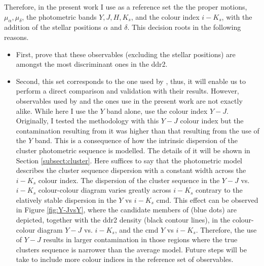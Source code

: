 Therefore, in the present work I use as a reference set the the proper motions, $\mu_{\alpha},\mu_{\delta}$, the photometric bands $Y,J,H,K_s$, and the colour index $i-K_s$, with the addition of the stellar positions  $\alpha$ and $\delta$. This decision roots in the following reasons.

\begin{itemize}

\item First, \citet{Sarro2014} prove that these observables (excluding the stellar positions) are amongst the most discriminant ones in the \gls{ddr2}. 

\item Second, this set corresponds to the one used by \cite{Bouy2015}, thus, it will enable us to perform a direct comparison and validation with their results. 
However, observables used by \cite{Bouy2015} and the ones use in the present work are not exactly alike. While here I use the $Y$ band alone, \citet{Bouy2015} use the colour index $Y-J$. Originally, I tested the methodology with this $Y-J$ colour index but the contamination resulting from it was higher than that resulting from the use of the $Y$ band. This is a consequence of how the intrinsic dispersion of the cluster photometric sequence is modelled. The details of it will be shown in Section \ref{subsect:cluster}. Here suffices to say that the photometric model describes the cluster sequence dispersion with a constant width across the $i-K_s$ colour index. The dispersion of the cluster sequence in the $Y-J$ vs. $i-K_s$ colour-colour diagram varies greatly across $i-K_s$ contrary to the elatively stable dispersion in the $Y$ vs $i-K_s$ \gls{cmd}. This effect can be observed in Figure \ref{fig:Y-JvsY}, where the candidate members of \citet{Bouy2015} (blue dots) are depicted, together with the \gls{ddr2} density (black contour lines), in the colour-colour diagram $Y-J$ vs. $i-K_s$, and the  \gls{cmd} $Y$ vs $i-K_s$.  Therefore, the use of $Y-J$ results in larger contamination in those regions where the true clusters sequence is narrower than the average model. Future steps will be take to include more colour indices in the reference set of observables.

\end{itemize}


